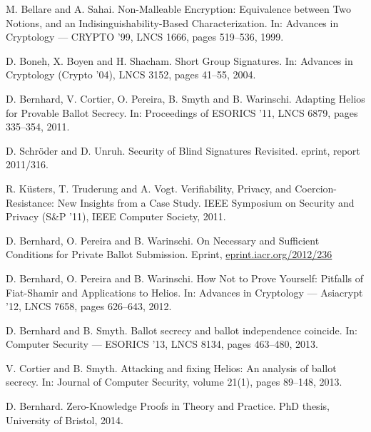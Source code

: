 \documentclass[envcountsame]{llncs}
\begin{document}
\begin{thebibliography}{XXX11}
M. Bellare and A. Sahai.
Non-Malleable Encryption: Equivalence between Two Notions, and an Indisinguishability-Based Characterization.
In: Advances in Cryptology --- CRYPTO '99, LNCS 1666, pages 519--536, 1999.

D. Boneh, X. Boyen and H. Shacham.
Short Group Signatures.
In: Advances in Cryptology (Crypto '04), LNCS 3152, pages 41--55, 2004.

D. Bernhard, V. Cortier, O. Pereira, B. Smyth and B. Warinschi.
Adapting Helios for Provable Ballot Secrecy.
In: Proceedings of ESORICS '11, LNCS 6879, pages 335--354, 2011.

D. Schr\"oder and D. Unruh.
Security of Blind Signatures Revisited.
eprint, report 2011/316.

R. Küsters, T. Truderung and A. Vogt.
Verifiability, Privacy, and Coercion-Resistance: New Insights from a Case Study.
IEEE Symposium on Security and Privacy (S\&P '11), IEEE Computer Society, 2011.

D. Bernhard, O. Pereira and B. Warinschi.
On Necessary and Sufficient Conditions for Private Ballot Submission.
Eprint, \url{eprint.iacr.org/2012/236}

D. Bernhard, O. Pereira and B. Warinschi.
How Not to Prove Yourself: Pitfalls of Fiat-Shamir and Applications to Helios.
In: Advances in Cryptology --- Asiacrypt '12, LNCS 7658, pages 626--643, 2012.

D. Bernhard and B. Smyth.
Ballot secrecy and ballot independence coincide.
In: Computer Security --- ESORICS '13, LNCS 8134, pages 463--480, 2013.

V. Cortier and B. Smyth.
Attacking and fixing Helios: An analysis of ballot secrecy.
In: Journal of Computer Security, volume 21(1), pages 89--148, 2013.

D. Bernhard.
Zero-Knowledge Proofs in Theory and Practice.
PhD thesis, University of Bristol, 2014.

\end{thebibliography}
\end{document}
